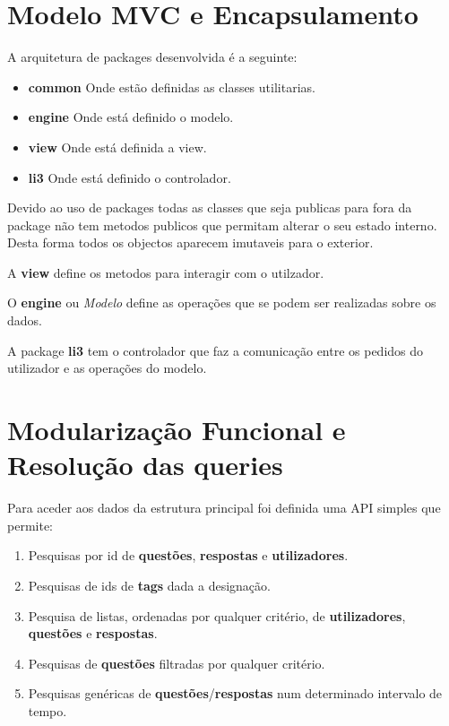 \documentclass[10pt,a4paper]{report}
\begin{document}
\chapter{Modelo MVC e Encapsulamento}
    A arquitetura de packages desenvolvida é a seguinte:
    \begin{itemize}
        \item \textbf{common} Onde estão definidas as classes utilitarias.
        \item \textbf{engine} Onde está definido o modelo.
        \item \textbf{view} Onde está definida a view.
        \item \textbf{li3} Onde está definido o controlador.
    \end{itemize}
    Devido ao uso de packages todas as classes que seja publicas para fora da
    package não tem metodos publicos que permitam alterar o seu estado interno.
    Desta forma todos os objectos aparecem imutaveis para o exterior.

    A \textbf{view} define os metodos para interagir com o utilzador.

    O \textbf{engine} ou \textit{Modelo} define as operações que se podem
    ser realizadas sobre os dados.
    
    A package \textbf{li3} tem o controlador que faz a comunicação entre os
    pedidos do utilizador e as operações do modelo.

\chapter{Modularização Funcional e Resolução das queries}
    Para aceder aos dados da estrutura principal foi definida uma API
    simples que permite:
    \begin{enumerate}[1.]
        \item Pesquisas por id de \textbf{questões}, \textbf{respostas} e
        \textbf{utilizadores}.
        \item Pesquisas de ids de \textbf{tags} dada a designação.
        \item Pesquisa de listas, ordenadas por qualquer critério, de
        \textbf{utilizadores}, \textbf{questões} e \textbf{respostas}.
        \item Pesquisas de \textbf{questões} filtradas por qualquer critério.
        \item Pesquisas genéricas de \textbf{questões}/\textbf{respostas}
        num determinado intervalo de tempo.
    \end{enumerate}
\end{document}
